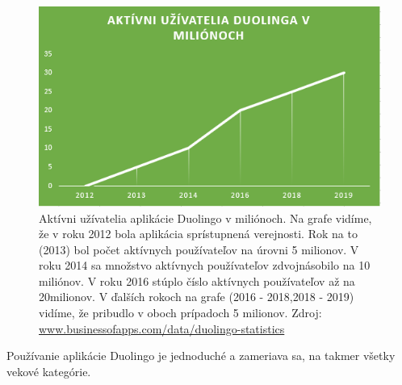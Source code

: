 \documentclass[10pt,oneside,slovak,a4paper]{article}
\begin{document}
\begin{figure}[h] %
\centering
\includegraphics[width=\textwidth]{duolingo.png}
\caption{ Aktívni užívatelia aplikácie Duolingo v miliónoch. Na grafe vidíme, že v roku 2012 bola aplikácia sprístupnená verejnosti. Rok na to (2013) bol počet aktívnych používateľov na úrovni 5 milionov. V roku 2014 sa množstvo aktívnych používateľov zdvojnásobilo na 10 miliónov. V roku 2016 stúplo číslo aktívnych používateľov až na 20milionov. V ďalších rokoch na grafe (2016 - 2018,2018 - 2019) vidíme, že pribudlo v oboch prípadoch 5 milionov.
Zdroj: \href{https://www.businessofapps.com/data/duolingo-statistics/}{www.businessofapps.com/data/duolingo-statistics}}
\label{duo-uzivatelia}
\end{figure}

Používanie aplikácie Duolingo je jednoduché a zameriava sa, na takmer všetky vekové kategórie\cite{duolingo}.
\end{document}
